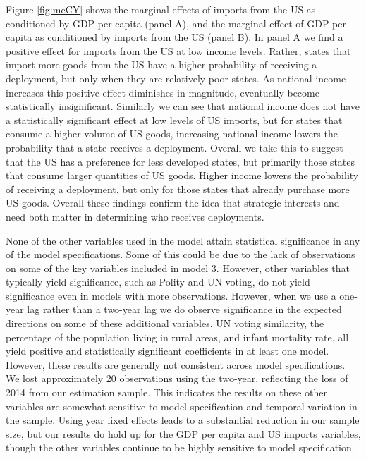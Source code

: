 \documentclass[12pt]{article}
\begin{document}
\begin{doublespace}
Figure \ref{fig:meCY} shows the marginal effects of imports from the US as conditioned by GDP per capita (panel A), and the marginal effect of GDP per capita as conditioned by imports from the US (panel B). In panel A we find a positive effect for imports from the US at low income levels. Rather, states that import more goods from the US have a higher probability of receiving a deployment, but only when they are relatively poor states. As national income increases this positive effect diminishes in magnitude, eventually become statistically insignificant. Similarly we can see that national income does not have a statistically significant effect at low levels of US imports, but for states that consume a higher volume of US goods, increasing national income lowers the probability that a state receives a deployment. Overall we take this to suggest that the US has a preference for less developed states, but primarily those states that consume larger quantities of US goods. Higher income lowers the probability of receiving a deployment, but only for those states that already purchase more US goods. Overall these findings confirm the idea that strategic interests and need both matter in determining who receives deployments.

None of the other variables used in the model attain statistical significance in any of the model specifications. Some of this could be due to the lack of observations on some of the key variables included in model 3. However, other variables that typically yield significance, such as Polity and UN voting, do not yield significance even in models with more observations. However, when we use a one-year lag rather than a two-year lag we do observe significance in the expected directions on some of these additional variables. UN voting similarity, the percentage of the population living in rural areas, and infant mortality rate, all yield positive and statistically significant coefficients in at least one model. However, these results are generally not consistent across model specifications. We lost approximately 20 observations using the two-year, reflecting the loss of 2014 from our estimation sample. This indicates the results on these other variables are somewhat sensitive to model specification and temporal variation in the sample. Using year fixed effects leads to a substantial reduction in our sample size, but our results do hold up for the GDP per capita and US imports variables, though the other variables continue to be highly sensitive to model specification.


\end{doublespace}
\end{document}
